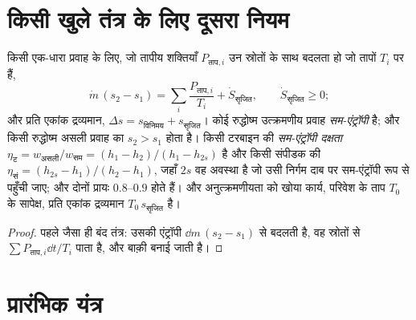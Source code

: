 \section{किसी खुले तंत्र के लिए दूसरा नियम}

\begin{theorem}[किसी स्थायी प्रवाह का एंट्रॉपी संतुलन]\label{thm:b2:open-systems:secondlaw}
किसी  एक-धारा प्रवाह के लिए, जो तापीय शक्तियाँ $P_{\text{ताप},i}$ उन
स्रोतों के साथ बदलता हो जो तापों $T_i$ पर हैं,
\[
\dot m\,(s_2 - s_1) = \sum_i\frac{P_{\text{ताप},i}}{T_i} + \dot S_{\text{सृजित}},
\qquad \dot S_{\text{सृजित}} \ge 0 ;
\]
और प्रति एकांक द्रव्यमान, $\Delta s = s_{\text{विनिमय}} + s_{\text{सृजित}}$। कोई रुद्धोष्म
उत्क्रमणीय प्रवाह \emph{सम-एंट्रॉपी} है; और किसी रुद्धोष्म असली प्रवाह का $s_2 >
s_1$ होता है। किसी टरबाइन की \emph{सम-एंट्रॉपी दक्षता}
$\eta_{\text{ट}} = w_{\text{असली}}/w_{\text{सम}} = (h_1 - h_2)/(h_1
- h_{2s})$ है और किसी संपीडक की $\eta_{\text{सं}} = (h_{2s} - h_1)/(h_2 -
h_1)$, जहाँ $2s$ वह अवस्था है जो उसी निर्गम दाब पर सम-एंट्रॉपी रूप से
पहुँची जाए; और दोनों प्रायः $0.8$--$0.9$ होते हैं। और अनुत्क्रमणीयता को खोया
कार्य, परिवेश के ताप $T_0$ के सापेक्ष,
प्रति एकांक द्रव्यमान $T_0\,s_{\text{सृजित}}$ है।
\end{theorem}

\begin{proof}
पहले जैसा ही बंद तंत्र: उसकी एंट्रॉपी $\dd m\,(s_2 -
s_1)$ से बदलती है, वह स्रोतों से $\sum P_{\text{ताप},i}\dd t/T_i$ पाता है, और
बाक़ी बनाई जाती है।
\end{proof}

\section{प्रारंभिक यंत्र}

